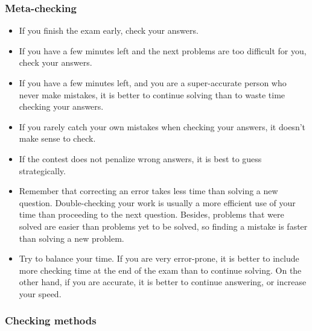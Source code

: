 \documentclass[10pt,paper=letter]{scrartcl}
\begin{document}
\subsubsection*{Meta-checking}

\begin{itemize}

\item If you finish the exam early, check your answers.

\item If you have a few minutes left and the next problems are too difficult for you, check your answers.

\item If you have a few minutes left, and you are a super-accurate person who never make mistakes, it is better to continue solving than to waste time checking your answers.

\item If you rarely catch your own mistakes when checking your answers, it doesn't make sense to check.

\item If the contest does not penalize wrong answers, it is best to guess strategically.

\item Remember that correcting an error takes less time than solving a new question. Double-checking your work is usually a more efficient use of your time than proceeding to the next question. Besides, problems that were solved are easier than problems yet to be solved, so finding a mistake is faster than solving a new problem.

\item Try to balance your time. If you are very error-prone, it is better to include more checking time at the end of the exam than to continue solving. On the other hand, if you are accurate, it is better to continue answering, or increase your speed.

\end{itemize}

\subsubsection*{Checking methods}
\end{document}
